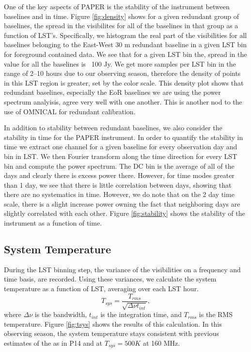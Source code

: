 \documentclass[twocolumn,numberedappendix]{emulateapj} \shorttitle{PSA64}
\begin{document}
One of the key aspects of PAPER is the stability of the instrument between
baselines and in time. Figure \ref{fig:density} shows for a given redundant
group of baselines, the spread in the visibilites for all of the baselines in
that group as a function of LST's. Specifically, we histogram the real part of
the visibilities for all baselines belonging to the East-West 30 m redundant
baseline in a given LST bin for foreground contained data. We see that for a
given LST bin the, spread in the value for all the baselines is ~100 Jy.  We get
more samples per LST bin in the range of 2--10 hours due to our observing
season, therefore the density of points in this LST region is greater, set by
the color scale. This density plot shows that redundant baselines, especially
the EoR baselines we are using the power spectrum analyisis, agree very well
with one another. This is another nod to the use of OMNICAL for redundant
calibration. 

In addition to stability between redundant baselines, we also consider the
stability in time for the PAPER instrument. In order to quantify the stability
in time we extract one channel for a given baseline for every observation day
and bin in LST. We then Fourier transform along the time direction for every LST
bin and compute the power spectrum. The DC bin is the average of all of the days
and clearly there is excess power there. However, for time modes greater than 1
day, we see that there is little correlation between days, showing that there
are no systematics in time. However, we do note that on the 2 day time scale,
there is a slight increase power owning the fact that neighboring days are
slightly correlated with each other.  Figure \ref{fig:stability} shows the
stability of the instrument as a function of time. 

\subsection{System Temperature}   
During the LST binning step, the variance of the visibilities on a frequency and
time basis, are recorded. Using these variances, we calculate the system
temperature as a function of LST, averaging over each LST hour. 
\begin{equation}
    T_{sys} = \frac{T_{rms}}{\sqrt{\Delta\nu t_{int}}}, 
\end{equation}
where $\Delta\nu$ is the bandwidth, $t_{int}$ is the integration time, and
$T_{rms}$ is the RMS temperature.
Figure \ref{fig:tsys} shows the results of this calculation. In this observing
season, the system temperature stays consistent with previous estimates of the
as in P14 and \citet{jacobs_et_al2014} at $T_{sys} =
500K$ at 160 MHz.
\end{document}
